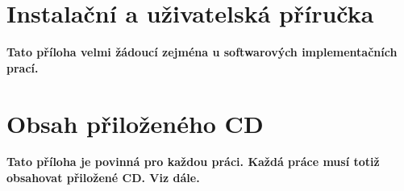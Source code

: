 \documentclass[11pt,twoside,a4paper]{book}
\begin{document}
\chapter{Instalační a uživatelská příručka}
\textbf{\large Tato příloha velmi žádoucí zejména u softwarových implementačních prací.}

\chapter{Obsah přiloženého CD}
\textbf{\large Tato příloha je povinná pro každou práci. Každá práce musí totiž obsahovat přiložené CD. Viz dále.}

\end{document}
